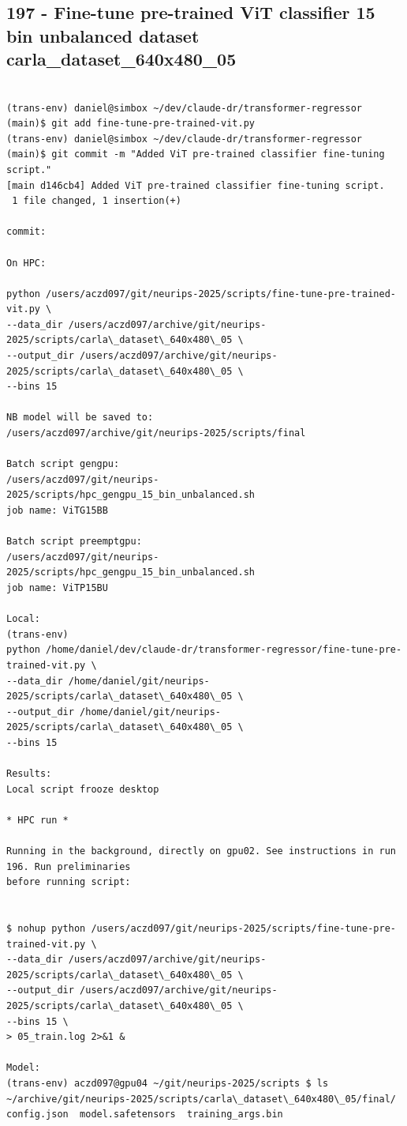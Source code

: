 \subsection{197 - Fine-tune pre-trained ViT classifier 15 bin unbalanced dataset carla\_dataset\_640x480\_05}
\label{app_res:197}

\begin{verbatim}

(trans-env) daniel@simbox ~/dev/claude-dr/transformer-regressor (main)$ git add fine-tune-pre-trained-vit.py
(trans-env) daniel@simbox ~/dev/claude-dr/transformer-regressor (main)$ git commit -m "Added ViT pre-trained classifier fine-tuning script."
[main d146cb4] Added ViT pre-trained classifier fine-tuning script.
 1 file changed, 1 insertion(+)
 
commit:

On HPC:

python /users/aczd097/git/neurips-2025/scripts/fine-tune-pre-trained-vit.py \
--data_dir /users/aczd097/archive/git/neurips-2025/scripts/carla\_dataset\_640x480\_05 \
--output_dir /users/aczd097/archive/git/neurips-2025/scripts/carla\_dataset\_640x480\_05 \
--bins 15

NB model will be saved to:
/users/aczd097/archive/git/neurips-2025/scripts/final

Batch script gengpu:
/users/aczd097/git/neurips-2025/scripts/hpc_gengpu_15_bin_unbalanced.sh
job name: ViTG15BB

Batch script preemptgpu:
/users/aczd097/git/neurips-2025/scripts/hpc_gengpu_15_bin_unbalanced.sh
job name: ViTP15BU

Local:
(trans-env)
python /home/daniel/dev/claude-dr/transformer-regressor/fine-tune-pre-trained-vit.py \
--data_dir /home/daniel/git/neurips-2025/scripts/carla\_dataset\_640x480\_05 \
--output_dir /home/daniel/git/neurips-2025/scripts/carla\_dataset\_640x480\_05 \
--bins 15

Results:
Local script frooze desktop

* HPC run *

Running in the background, directly on gpu02. See instructions in run 196. Run preliminaries
before running script:


$ nohup python /users/aczd097/git/neurips-2025/scripts/fine-tune-pre-trained-vit.py \
--data_dir /users/aczd097/archive/git/neurips-2025/scripts/carla\_dataset\_640x480\_05 \
--output_dir /users/aczd097/archive/git/neurips-2025/scripts/carla\_dataset\_640x480\_05 \
--bins 15 \
> 05_train.log 2>&1 &

Model:
(trans-env) aczd097@gpu04 ~/git/neurips-2025/scripts $ ls ~/archive/git/neurips-2025/scripts/carla\_dataset\_640x480\_05/final/
config.json  model.safetensors  training_args.bin



\end{verbatim}

